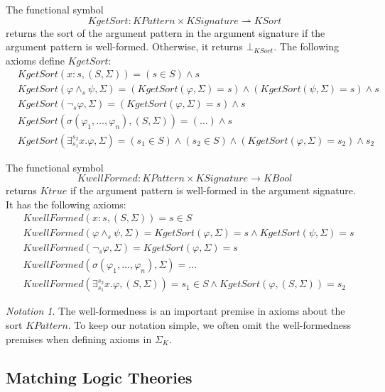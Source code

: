\documentclass[UTF8]{article}
\newcounter{thmcounter}
\theoremstyle{plain}
\theoremstyle{definition}
\theoremstyle{remark}
\newtheorem{notation}[thmcounter]{Notation}
\newcommand{\cln}{{:}}
\newcommand{\KBool}{\mathit{KBool}}
\newcommand{\Ktrue}{\mathit{Ktrue}}
\newcommand{\KSort}{\mathit{KSort}}
\newcommand{\KPattern}{\mathit{KPattern}}
\newcommand{\kand}{\wedge}
\newcommand{\knot}{\neg}
\newcommand{\kexists}{\exists}
\newcommand{\KSignature}{\mathit{KSignature}}
\newcommand{\KwellFormed}{\mathit{KwellFormed}}
\newcommand{\KgetSort}{\mathit{KgetSort}}
\begin{document}
The functional symbol
$$\KgetSort \colon \KPattern \times \KSignature \rightharpoonup \KSort$$
returns the sort of the argument pattern in the argument signature if the argument pattern is well-formed.
Otherwise, it returns $\bot_\KSort$.
The following axioms define $\KgetSort$:
\begin{align*}
&\KgetSort(x \cln s, (S, \Sigma)) = (s \in S) \wedge s
\\
&\KgetSort(\varphi \kand_s \psi, \Sigma) = (\KgetSort(\varphi, \Sigma) = s) \wedge (\KgetSort(\psi, \Sigma) = s) \wedge s
\\
&\KgetSort(\knot_s \varphi, \Sigma) = (\KgetSort(\varphi, \Sigma) = s) \wedge s
\\
&\KgetSort(\sigma(\varphi_1,\dots,\varphi_n), (S, \Sigma)) = (\dots) \wedge s
\\
&\KgetSort(\kexists_{s_1}^{s_2} x . \varphi, \Sigma) = (s_1 \in S) \wedge (s_2 \in S) \wedge (\KgetSort(\varphi, \Sigma) = s_2) \wedge s_2
\end{align*}

The functional symbol 
$$\KwellFormed \colon \KPattern \times \KSignature \to \KBool$$ returns $\Ktrue$ if the argument pattern is well-formed in the argument signature.
It has the following axioms:
\begin{align*}
&\KwellFormed(x \cln s, (S, \Sigma)) = s \in S
\\
&\KwellFormed(\varphi \kand_s \psi, \Sigma) = \KgetSort(\varphi, \Sigma) = s \wedge \KgetSort(\psi, \Sigma) = s
\\
&\KwellFormed(\knot_s \varphi, \Sigma) = \KgetSort(\varphi, \Sigma) = s
\\
&\KwellFormed(\sigma(\varphi_1, \dots, \varphi_n), \Sigma) = \dots
\\
&\KwellFormed(\kexists_{s_1}^{s_2} x . \varphi, (S, \Sigma)) = s_1 \in S \wedge \KgetSort(\varphi, (S, \Sigma)) = s_2
\end{align*}

\begin{notation}\label{omit-well-formedness-premises}
	The well-formedness is an important premise in axioms about the sort 
	$\KPattern$. To keep our notation simple, we often omit the well-formedness 
	premises when defining axioms in $\Sigma_K$.
\end{notation}

\subsection{Matching Logic Theories}
\end{document}
